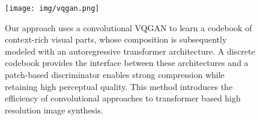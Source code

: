 			\begin{figure}[H]
				\centering
				\texttt{[image: img/vqgan.png]}
				\caption[VQGAN]{Our approach uses a convolutional VQGAN to learn a codebook of context-rich visual parts, whose composition is subsequently modeled with an autoregressive transformer architecture. A discrete codebook provides the interface between these architectures and a patch-based discriminator enables strong compression while retaining high perceptual quality. This method introduces the efficiency of convolutional approaches to transformer based high resolution image synthesis.}
				\label{fig:vqgan}
			\end{figure}

		
		





